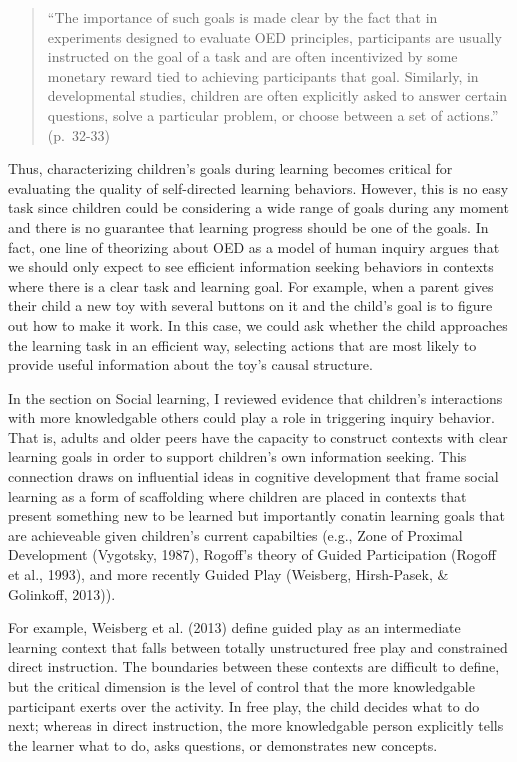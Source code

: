 \documentclass[english,floatsintext,man]{apa6}
\theoremstyle{definition}
\theoremstyle{definition}
\theoremstyle{definition}
\theoremstyle{remark}
\begin{document}
\begin{quote}
\enquote{The importance of such goals is made clear by the fact that in
experiments designed to evaluate OED principles, participants are
usually instructed on the goal of a task and are often incentivized by
some monetary reward tied to achieving participants that goal.
Similarly, in developmental studies, children are often explicitly asked
to answer certain questions, solve a particular problem, or choose
between a set of actions.} (p.~32-33)
\end{quote}

\noindent
Thus, characterizing children's goals during learning becomes critical
for evaluating the quality of self-directed learning behaviors. However,
this is no easy task since children could be considering a wide range of
goals during any moment and there is no guarantee that learning progress
should be one of the goals. In fact, one line of theorizing about OED as
a model of human inquiry argues that we should only expect to see
efficient information seeking behaviors in contexts where there is a
clear task and learning goal. For example, when a parent gives their
child a new toy with several buttons on it and the child's goal is to
figure out how to make it work. In this case, we could ask whether the
child approaches the learning task in an efficient way, selecting
actions that are most likely to provide useful information about the
toy's causal structure.

In the section on Social learning, I reviewed evidence that children's
interactions with more knowledgable others could play a role in
triggering inquiry behavior. That is, adults and older peers have the
capacity to construct contexts with clear learning goals in order to
support children's own information seeking. This connection draws on
influential ideas in cognitive development that frame social learning as
a form of scaffolding where children are placed in contexts that present
something new to be learned but importantly conatin learning goals that
are achieveable given children's current capabilties (e.g., Zone of
Proximal Development (Vygotsky, 1987), Rogoff's theory of Guided
Participation (Rogoff et al., 1993), and more recently Guided Play
(Weisberg, Hirsh-Pasek, \& Golinkoff, 2013)).

For example, Weisberg et al. (2013) define guided play as an
intermediate learning context that falls between totally unstructured
free play and constrained direct instruction. The boundaries between
these contexts are difficult to define, but the critical dimension is
the level of control that the more knowledgable participant exerts over
the activity. In free play, the child decides what to do next; whereas
in direct instruction, the more knowledgable person explicitly tells the
learner what to do, asks questions, or demonstrates new concepts.
\end{document}
